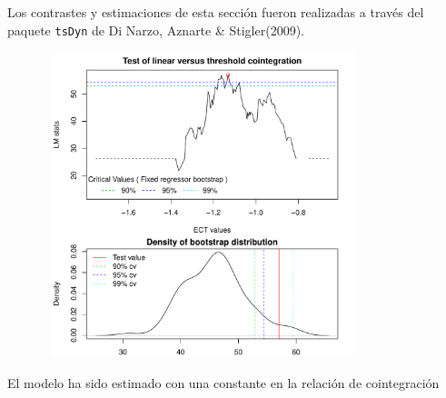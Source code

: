 \documentclass[12pt, twoside]{book}\usepackage[]{graphicx}\usepackage[]{color}
\newenvironment{knitrout}{}{} %
\numberwithin{equation}{section}
\numberwithin{theorem}{section}
\numberwithin{teorema}{section}
\numberwithin{defi}{section}
\numberwithin{prop}{section}
\numberwithin{defi}{section}
\theoremstyle{plain}
\begin{document}
Los contrastes y estimaciones de esta sección fueron realizadas a través del paquete \texttt{tsDyn} de Di Narzo, Aznarte \& Stigler(2009).

\begin{knitrout}
\color{fgcolor}

{\centering \includegraphics[width=4.5in,height=3.5in]{figure/unnamed-chunk-24-1} 

}



\end{knitrout}


El modelo ha sido estimado con una constante en la relación de cointegración
\end{document}

